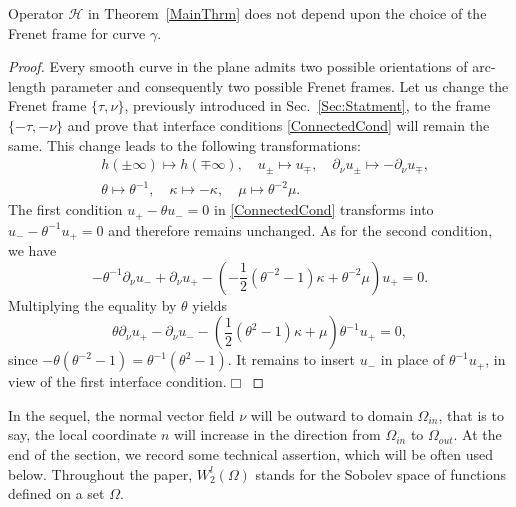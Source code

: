 \begin{proposition}\label{PropInvarianceOfCnds}
  Operator $\mathcal{H}$ in Theorem~\ref{MainThrm} does not depend upon the choice of the Frenet frame for curve $\gamma$.
\end{proposition}
\begin{proof}
  Every smooth curve in the plane admits two possible orientations of arc-length parameter and consequently two possible  Frenet frames. Let us change the Frenet frame $\{\tau, \nu\}$, previously introduced in Sec.~\ref{Sec:Statment}, to the frame $\{-\tau, -\nu\}$ and prove that
interface conditions \eqref{ConnectedCond} will remain the same. This change leads to the following transformations:
\begin{eqnarray}\nonumber
&h(\pm\infty)\mapsto h(\mp\infty), \quad u_\pm\mapsto u_\mp, \quad \partial_\nu u_\pm \mapsto -\partial_\nu u_\mp,\\\nonumber
& \theta\mapsto \theta^{-1}, \quad \kappa\mapsto -\kappa,\quad \mu\mapsto \theta^{-2}\mu.
\end{eqnarray}
The first condition $u_+-\theta u_-=0$ in \eqref{ConnectedCond} transforms into $u_--\theta^{-1} u_+=0$ and therefore remains unchanged. As for the second condition, we have
$$
 -\theta^{-1}\partial_\nu u_-+\partial_\nu u_+
-\left(-\textstyle\frac{1}{2 }(\theta^{-2}-1)\kappa+\theta^{-2}\mu\right) u_+=0.
$$
Multiplying the equality by $\theta$  yields
$$
\theta\partial_\nu u_+-\partial_\nu u_-
-\left(\textstyle\frac{1}{2 }(\theta^{2}-1)\kappa+\mu\right) \theta^{-1} u_+=0,
$$
since $-\theta(\theta^{-2}-1)=\theta^{-1}(\theta^{2}-1)$. It remains to insert $u_-$ in place of $\theta^{-1} u_+$, in view of the first interface condition.\hfill$\Box$
\end{proof}

In the sequel, the normal vector field $\nu$ will be outward to domain $\Omega_{in}$, that is to say, the local coordinate $n$ will increase in the direction from $\Omega_{in}$ to $\Omega_{out}$.
At the end of the section,  we record some technical assertion, which  will be often used below.
Throughout the paper, $W_2^l(\Omega)$ stands for the Sobolev space of functions defined on a set $\Omega$.



